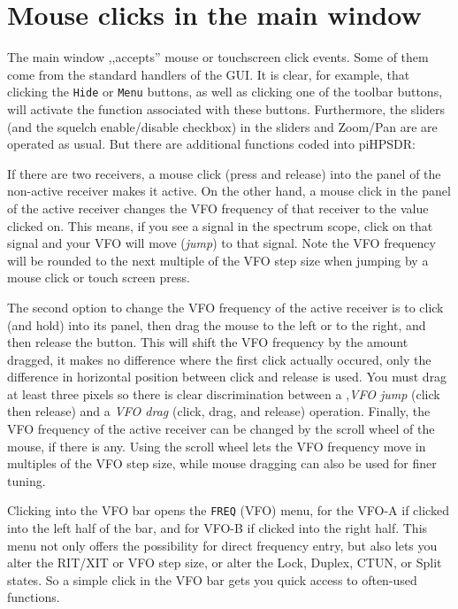 \documentclass[12pt]{book}
\def\rett#1{\texttt{\color{red}#1}}
\def\bltt#1{\texttt{\color{blue}#1}}
\begin{document}
\section{Mouse clicks in the main window}
The main window ,,accepts'' mouse or touchscreen click events.
Some of them come from the standard handlers of the GUI. It is
clear, for example, that clicking the \rett{Hide} or
\rett{Menu} buttons, as well as clicking one of the
toolbar buttons, will activate the function associated with
these buttons. Furthermore, the sliders (and the squelch enable/disable
checkbox) in the sliders and Zoom/Pan are are operated as usual.
But there are additional functions coded into piHPSDR:

If there are two receivers, a mouse click (press and release) into
the panel of the non-active receiver makes it active. On the other
hand, a mouse click in the panel of the active receiver changes
the VFO frequency of that receiver to the value clicked on.
This means, if you see a signal in the spectrum scope, click
on that signal and your VFO will move (\textit{jump}) to that signal.
Note the VFO frequency will be  rounded to the next multiple of
the VFO step size when jumping by a mouse  click or
touch screen press.

The second option to change the VFO frequency of the active receiver
is to click (and hold) into its panel, then drag the mouse to the left
or to the right, and then release the button. This will shift the
VFO frequency by the amount dragged, it makes no difference
where the first click actually occured, only the difference
in horizontal position between click and release is used. You must
drag at least three pixels so there is clear discrimination between
a ,\textit{VFO jump} (click then release) and a \textit{VFO drag} (click, drag,
and release) operation. Finally, the VFO frequency of the active
receiver can be changed by the scroll wheel of the mouse, if there
is any. Using the scroll wheel lets the VFO frequency move in multiples
of the VFO step size, while mouse dragging can also be used for
finer tuning.

Clicking into the VFO bar opens the \bltt{FREQ} (VFO) menu,
for the VFO-A if clicked into the left half of the bar, and for
VFO-B if clicked into the right half. This menu not only offers
the possibility for direct frequency entry, but also lets you
alter the RIT/XIT or VFO step size, or alter the Lock, Duplex,
CTUN, or Split states. So a simple click in the VFO bar
gets you quick access to often-used functions.
\end{document}
